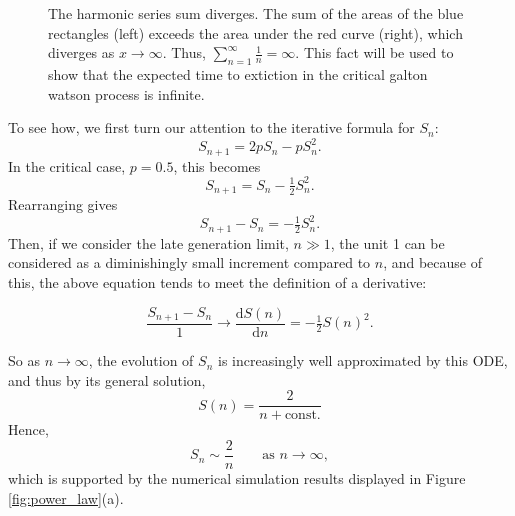 \documentclass[11pt,a4paper]{article}
\theoremstyle{plain}
\theoremstyle{definition}
\begin{document}
\begin{figure}[H]
\caption{The harmonic series sum diverges. The sum of the areas of the blue rectangles (left) exceeds the area under the red curve (right), which diverges as $x \to \infty$. Thus, $\sum_{n=1}^{\infty} \frac{1}{n} = \infty$. This fact will be used to show that the expected time to extiction in the critical galton watson process is infinite.}
\end{figure}


\noindent
To see how, we first turn our attention to the iterative formula for $S_n$:
\[
S_{n+1} = 2p S_n - p S_n^2.
\]
In the critical case, $p = 0.5$, this becomes
\[
S_{n+1} = S_n - \tfrac{1}{2} S_n^2.
\]
Rearranging gives
\[
S_{n+1} - S_n = -\tfrac{1}{2} S_n^2.
\]
Then, if we consider the late generation limit, $n \gg 1 $, the unit 1 can be considered as a diminishingly small increment compared to $n$, and because of this, the above equation tends to meet the definition of a derivative:

$$\frac{S_{n+1} - S_n}{1} \rightarrow \frac{\mathrm{d}S(n)}{\mathrm{d} n}  = -\tfrac{1}{2} S(n)^2.$$


\noindent
So as $n\to\infty$, the evolution of $S_n$ is increasingly well approximated by this ODE, and thus by its general solution, 
$$S(n) = \frac{2}{n + \text{const.}}$$
Hence, 
\begin{equation}
S_n \sim \frac{2}{n}
\qquad \text{as } n \to \infty, \label{twoovrn_sn}
\end{equation}
which is supported by the numerical simulation results displayed in Figure \ref{fig:power_law}(a).
\end{document}
